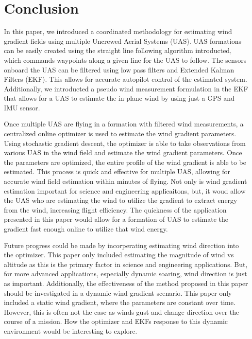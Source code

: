 \section{Conclusion}

In this paper, we introduced a coordinated methodology for estimating wind gradient fields using multiple Uncrewed Aerial Systems (UAS). 
UAS formations can be easily created using the straight line following algorithm introducted, which commands waypoints along a given line for the UAS to follow.
The sensors onboard the UAS can be filtered using low pass filters and Extended Kalman Filters (EKF). This allows for accurate autopilot control of the estimated system.
Additionally, we introducted a pseudo wind measurement formulation in the EKF that allows for a UAS to estimate the in-plane wind by using just a GPS and IMU sensor.

Once multiple UAS are flying in a formation with filtered wind measurements, a centralized online optimizer is used to estimate the wind gradient parameters.
Using stochastic gradient descent, the optimizer is able to take observations from various UAS in the wind field and estimate the wind gradient parameters.
Once the parameters are optimized, the entire profile of the wind gradient is able to be estimated. This process is quick and effective for multiple UAS, allowing for accurate wind field estimation within minutes of flying.
Not only is wind gradient estimation important for science and engineering applicaitons, but, it woud allow the UAS who are estimating the wind to utilize the gradient to extract energy from the wind, increasing flight efficiency.
The quickness of the application presented in this paper would allow for a formation of UAS to estimate the gradient fast enough online to utilize that wind energy.

Future progress could be made by incorperating estimating wind direction into the optimizer. 
This paper only included estimating the magnitude of wind vs altitude as this is the primary factor in science and engineering applications.
But, for more advanced applications, especially dynamic soaring, wind direction is just as important.
Additionally, the effectiveness of the method proposed in this paper should be investigated in a dynamic wind gradient scenario. 
This paper only included a static wind gradient, where the parameters are constant over time.
However, this is often not the case as winds gust and change direction over the course of a mission.
How the optimizer and EKFs response to this dynamic environment would be interesting to explore.


